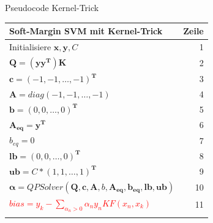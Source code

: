 \documentclass[ngerman]{beamer}
\begin{document}
\begin{frame}{Pseudocode Kernel-Trick}
    \begin{tabular}{|l r|}
        \hline
        \textbf{Soft-Margin SVM mit Kernel-Trick} & \textbf{Zeile} \\
        \hline
        Initialisiere $\mathbf{x}, \mathbf{y}, C$ & 1\\
        $\mathbf{Q} = (\mathbf{y}\mathbf{y}^{\mathbf{T}})\mathbf{K}$ & 2\\
        $\mathbf{c} = \left( -1, -1, \ldots, -1 \right)^{\mathbf{T}}$ & 3 \\
        $\mathbf{A} = diag\left( -1, -1, \ldots, -1 \right)$ & 4 \\
        $\mathbf{b} = \left( 0, 0, \ldots, 0 \right)^{\mathbf{T}}$ & 5\\
        $\mathbf{A_{eq}} = \mathbf{y}^{\mathbf{T}}$ & 6\\
        $b_{eq} = 0$ & 7\\
        $\mathbf{lb} = \left( 0, 0, \ldots, 0 \right)^{\mathbf{T}}$ & 8 \\
        $\mathbf{ub} = C * \left( 1, 1, \ldots, 1 \right)^{\mathbf{T}}$ & 9 \\
        $\mathbf{\alpha} = QPSolver\left( \mathbf{Q}, \mathbf{c}, \mathbf{A}, b, \mathbf{A_{eq}}, \mathbf{b_{eq}}, \mathbf{lb}, \mathbf{ub} \right)$ & 10\\
        \textcolor{red}{$bias = y_{k} - \sum\limits_{\alpha_{n} > 0} \alpha_{n} y_{n} KF\left( x_{n}, x_{k} \right) $} & 11 \\
        & \\
        \hline
    \end{tabular}
\end{frame}
\end{document}
